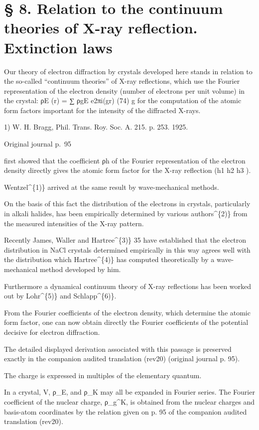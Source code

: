 \documentclass[10pt]{article}
\newcommand{\origpage}[1]{\par\medskip\noindent\hfill{\small\color{notegray}Original journal p.~#1}\hfill\mbox{}\par\smallskip}
\begin{document}
\section*{§ 8. Relation to the continuum theories of X-ray reflection. Extinction laws}
Our theory of electron diffraction by crystals developed here stands in relation to the so-called “continuum theories” of X-ray reflections, which use the Fourier representation of the electron density (number of electrons per unit volume) in the crystal: ρE (r) = ∑ ρgE e2πi(gr) (74) g for the computation of the atomic form factors important for the intensity of the diffracted X-rays.\par
\noindent\footnotesize 1) W. H. Bragg, Phil. Trans. Roy. Soc. A. 215. p. 253. 1925.\par\normalsize
\origpage{95}
first showed that the coefficient ρh of the Fourier representation of the electron density directly gives the atomic form factor for the X-ray reflection (h1 h2 h3 ).\par
Wentzel\textasciicircum{}\{1)\} arrived at the same result by wave-mechanical methods.\par
On the basis of this fact the distribution of the electrons in crystals, particularly in alkali halides, has been empirically determined by various authors\textasciicircum{}\{2)\} from the measured intensities of the X-ray pattern.\par
Recently James, Waller and Hartree\textasciicircum{}\{3)\} 35 have established that the electron distribution in NaCl crystals determined empirically in this way agrees well with the distribution which Hartree\textasciicircum{}\{4)\} has computed theoretically by a wave-mechanical method developed by him.\par
Furthermore a dynamical continuum theory of X-ray reflections has been worked out by Lohr\textasciicircum{}\{5)\} and Schlapp\textasciicircum{}\{6)\}.\par
From the Fourier coefficients of the electron density, which determine the atomic form factor, one can now obtain directly the Fourier coefficients of the potential decisive for electron diffraction.\par
The detailed displayed derivation associated with this passage is preserved exactly in the companion audited translation (rev20) (original journal p. 95).\par
The charge is expressed in multiples of the elementary quantum.\par
In a crystal, V, ρ\_E, and ρ\_K may all be expanded in Fourier series. The Fourier coefficient of the nuclear charge, ρ\_g\textasciicircum{}K, is obtained from the nuclear charges and basis-atom coordinates by the relation given on p. 95 of the companion audited translation (rev20).\par
\end{document}
